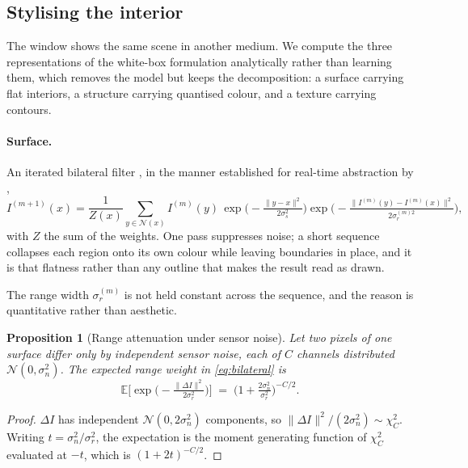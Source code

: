 \documentclass{article}
\newtheorem{proposition}{Proposition}
\theoremstyle{definition}
\begin{document}
\subsection{Stylising the interior}
\label{sec:stylise}

The window shows the same scene in another medium. We compute the three
representations of the white-box formulation \citep{thakur2021cartoonization}
analytically rather than learning them, which removes the model but keeps the
decomposition: a surface carrying flat interiors, a structure carrying quantised
colour, and a texture carrying contours.

\paragraph{Surface.}
An iterated bilateral filter \citep{tomasi1998bilateral}, in the manner
established for real-time abstraction by \citet{winnemoller2006abstraction},
\begin{equation}
  \label{eq:bilateral}
  I^{(m+1)}(x) = \frac{1}{Z(x)} \sum_{y \in \mathcal{N}(x)} I^{(m)}(y)\,
    \exp\!\Big(\!-\tfrac{\|y-x\|^2}{2\sigma_s^2}\Big)
    \exp\!\Big(\!-\tfrac{\|I^{(m)}(y)-I^{(m)}(x)\|^2}{2\sigma_r^{(m)2}}\Big),
\end{equation}
with $Z$ the sum of the weights. One pass suppresses noise; a short sequence
collapses each region onto its own colour while leaving boundaries in place, and
it is that flatness rather than any outline that makes the result read as drawn.

The range width $\sigma_r^{(m)}$ is not held constant across the sequence, and
the reason is quantitative rather than aesthetic.

\begin{proposition}[Range attenuation under sensor noise]
\label{prop:range}
Let two pixels of one surface differ only by independent sensor noise, each of
$C$ channels distributed $\mathcal{N}(0,\sigma_n^2)$. The expected range weight
in \eqref{eq:bilateral} is
\[
  \mathbb{E}\Big[\exp\!\Big(\!-\tfrac{\|\Delta I\|^2}{2\sigma_r^2}\Big)\Big]
  \;=\; \Big(1 + \tfrac{2\sigma_n^2}{\sigma_r^2}\Big)^{-C/2}.
\]
\end{proposition}

\begin{proof}
$\Delta I$ has independent $\mathcal{N}(0,2\sigma_n^2)$ components, so
$\|\Delta I\|^2/(2\sigma_n^2) \sim \chi^2_C$. Writing $t=\sigma_n^2/\sigma_r^2$,
the expectation is the moment generating function of $\chi^2_C$ evaluated at
$-t$, which is $(1+2t)^{-C/2}$.
\end{proof}
\end{document}
